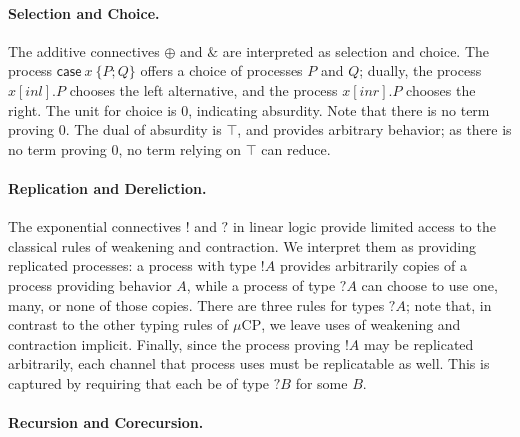 \documentclass[orivec,envcountsame]{llncs}
\newcommand{\with}{\mathbin\binampersand}
\newcommand{\cpbang}[1]{{! #1}}
\newcommand{\cpquery}[1]{{? #1}}
\newcommand{\mkwd}[1]{\mathsf{#1}}
\newcommand{\clabel}[1]{\mathit{#1}}
\renewcommand{\case}[2]{\mkwd{case}\:#1\:\{#2\}}
\newcommand{\sel}[2]{#1[\clabel{#2}]}
\newcommand{\mucp}{$\mu\mathrm{CP}$\xspace}
\begin{document}
\paragraph{Selection and Choice.}

The additive connectives $\oplus$ and $\with$ are interpreted as selection and choice. The process
$\case{x}{P;Q}$ offers a choice of processes $P$ and $Q$; dually, the process $\sel{x}{inl}.P$
chooses the left alternative, and the process $\sel{x}{inr}.P$ chooses the right.  The unit for
choice is $0$, indicating absurdity. Note that there is no term proving $0$.  The dual of absurdity
is $\top$, and provides arbitrary behavior; as there is no term proving $0$, no term relying on
$\top$ can reduce.

\paragraph{Replication and Dereliction.}

The exponential connectives $!$ and $?$ in linear logic provide limited access to the classical
rules of weakening and contraction.  We interpret them as providing replicated processes: a process
with type $\cpbang{A}$ provides arbitrarily copies of a process providing behavior $A$, while a
process of type $\cpquery{A}$ can choose to use one, many, or none of those copies.  There are three
rules for types $\cpquery{A}$; note that, in contrast to the other typing rules of \mucp, we leave
uses of weakening and contraction implicit.  Finally, since the process proving $\cpbang{A}$ may be
replicated arbitrarily, each channel that process uses must be replicatable as well.  This is
captured by requiring that each be of type $\cpquery{B}$ for some $B$.

\paragraph{Recursion and Corecursion.}
\end{document}
